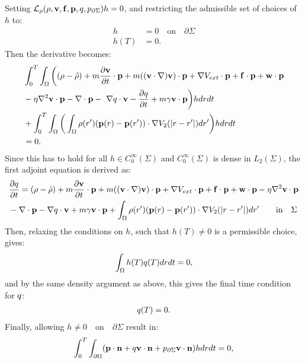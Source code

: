 Setting $\mathcal{L}_\rho(\rho,\mathbf{v},\mathbf{f},\mathbf{p},q,{p}_{\partial \Sigma})h=0$, and restricting the admissible set of choices of $h$ to:
\begin{align*}
h&=0 \quad \text{on} \quad \partial \Sigma\\
h(T)&=0.
\end{align*}
Then the derivative becomes:
\begin{align*}
 &\int_0^T \int_\Omega \bigg( (\rho - \hat {\rho}) +m  \frac{\partial \mathbf{v}}{\partial t}\cdot \mathbf{p} + m  ((\mathbf{v} \cdot \nabla)\mathbf{v} )\cdot \mathbf{p}+ \nabla V_{ext}\cdot \mathbf{p} + \mathbf{f} \cdot \mathbf{p} + \mathbf{w} \cdot \mathbf{p} \\
 &- \eta \nabla^2 \mathbf{v} \cdot \mathbf{p}  -\nabla\cdot \mathbf{p}  - \ \nabla q \cdot \mathbf{v}  -  \frac{\partial q}{\partial t} +m \gamma \mathbf{v} \cdot \mathbf{p} \bigg) h dr dt \\
 &+ \int_0^T \int_\Omega \bigg(  \int_\Omega  \rho(r')(\mathbf{p}(r) - \mathbf{p}(r')) \cdot\nabla V_2(|r-r'|)   dr'  \bigg)hdr dt\\
 &=0.
\end{align*}
Since this has to hold for all $h \in C_0^\infty(\Sigma)$ and $C_0^\infty(\Sigma)$ is dense in $L_2(\Sigma)$, the first adjoint equation is derived as:
\begin{align}
& \frac{\partial q}{\partial t} = (\rho - \hat {\rho}) +m  \frac{\partial \mathbf{v}}{\partial t}\cdot \mathbf{p} + m ( (\mathbf{v} \cdot \nabla)\mathbf{v}) \cdot \mathbf{p}+ \nabla V_{ext}\cdot \mathbf{p} + \mathbf{f} \cdot \mathbf{p} + \mathbf{w} \cdot \mathbf{p}  - \eta \nabla^2 \mathbf{v} \cdot \mathbf{p} \\
&-\nabla\cdot \mathbf{p}  -  \nabla q \cdot \mathbf{v} + m \gamma \mathbf{v} \cdot \mathbf{p} + \int_\Omega  \rho(r')( \mathbf{p}(r) - \mathbf{p}(r') ) \cdot\nabla V_2(|r-r'|)   dr' \qquad \text{in} \quad \Sigma \notag
\end{align}
Then, relaxing the conditions on $h$, such that $h(T) \neq 0$ is a permissible choice, gives:
\begin{align*}
\int_\Omega h(T) q(T) dr dt=0,
\end{align*}
and by the same density argument as above, this gives the final time condition for $q$:
\begin{align*}
q(T) = {0} .
\end{align*}
Finally, allowing $h \neq 0 \quad \text{on} \quad \partial \Sigma$ result in:
\begin{align*}
\int_0^T \int_{\partial \Omega} ( \mathbf{p} \cdot \mathbf{n}  +  q \mathbf{v} \cdot \mathbf{n}   +{p}_{\partial \Sigma} \mathbf{v} \cdot \mathbf{n})h  dr dt=0,
\end{align*}

